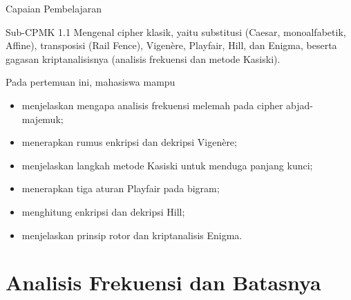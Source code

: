 \documentclass[aspectratio=169,11pt]{beamer}
\begin{document}
\begin{frame}{Capaian Pembelajaran}
    \begin{block}{Sub-CPMK 1.1}
        \footnotesize
        Mengenal cipher klasik, yaitu substitusi (Caesar, monoalfabetik,
        Affine), transposisi (Rail Fence), Vigen\`{e}re, Playfair, Hill,
        dan Enigma, beserta gagasan kriptanalisisnya (analisis frekuensi
        dan metode Kasiski).
    \end{block}
    \vspace{0.12cm}
    \begin{exampleblock}{Pada pertemuan ini, mahasiswa mampu}
        \footnotesize
        \begin{itemize}
            \item menjelaskan mengapa analisis frekuensi melemah pada cipher
                  abjad-majemuk;
            \item menerapkan rumus enkripsi dan dekripsi Vigen\`ere;
            \item menjelaskan langkah metode Kasiski untuk menduga panjang
                  kunci;
            \item menerapkan tiga aturan Playfair pada bigram;
            \item menghitung enkripsi dan dekripsi Hill;
            \item menjelaskan prinsip rotor dan kriptanalisis Enigma.
        \end{itemize}
    \end{exampleblock}
\end{frame}

\section{Analisis Frekuensi dan Batasnya}
\end{document}
